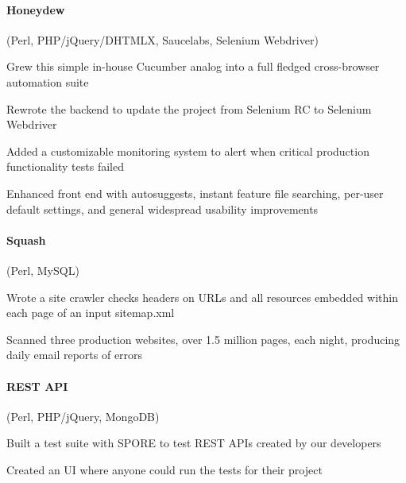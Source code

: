 \begin{position}
%
  \paragraph{Honeydew} (Perl, PHP/jQuery/DHTMLX, Saucelabs, Selenium Webdriver)
  \begin{myitem}
  \item Grew this simple in-house Cucumber analog into a full fledged cross-browser automation suite
  \item Rewrote the backend to update the project from Selenium RC to Selenium Webdriver
  \item Added a customizable monitoring system to alert when critical production functionality tests failed
  \item Enhanced front end with autosuggests, instant feature file searching, per-user default
    settings, and general widespread usability improvements
  \end{myitem}
%
%
  \paragraph{Squash} (Perl, MySQL)
  \begin{myitem}
  \item Wrote a site crawler checks headers on URLs and all resources embedded within each page of an
    input sitemap.xml
  \item Scanned three production websites, over 1.5 million pages,
    each night, producing daily email reports of errors
  \end{myitem}
%
  \paragraph{REST API} (Perl, PHP/jQuery, MongoDB)
  \begin{myitem}
  \item Built a test suite with SPORE to test REST APIs created by our developers
  \item Created an UI where anyone could run the tests for their project
  \end{myitem}
%

\end{position}
